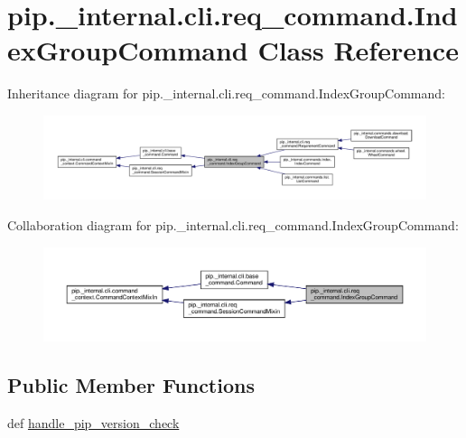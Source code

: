 \hypertarget{classpip_1_1__internal_1_1cli_1_1req__command_1_1IndexGroupCommand}{}\section{pip.\+\_\+internal.\+cli.\+req\+\_\+command.\+Index\+Group\+Command Class Reference}
\label{classpip_1_1__internal_1_1cli_1_1req__command_1_1IndexGroupCommand}


Inheritance diagram for pip.\+\_\+internal.\+cli.\+req\+\_\+command.\+Index\+Group\+Command\+:
\nopagebreak
\begin{figure}[H]
\begin{center}
\leavevmode
\includegraphics[width=350pt]{classpip_1_1__internal_1_1cli_1_1req__command_1_1IndexGroupCommand__inherit__graph}
\end{center}
\end{figure}


Collaboration diagram for pip.\+\_\+internal.\+cli.\+req\+\_\+command.\+Index\+Group\+Command\+:
\nopagebreak
\begin{figure}[H]
\begin{center}
\leavevmode
\includegraphics[width=350pt]{classpip_1_1__internal_1_1cli_1_1req__command_1_1IndexGroupCommand__coll__graph}
\end{center}
\end{figure}
\subsection*{Public Member Functions}
\begin{DoxyCompactItemize}
\item 
def \hyperlink{classpip_1_1__internal_1_1cli_1_1req__command_1_1IndexGroupCommand_a9800c4d19c06cfc074842bd5dd94ffed}{handle\+\_\+pip\+\_\+version\+\_\+check}
\end{DoxyCompactItemize}
